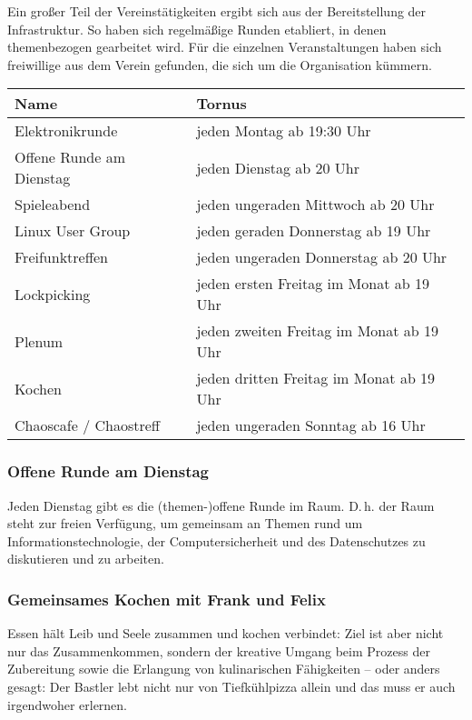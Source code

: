 \documentclass[10pt,DIV16]{scrartcl}
\begin{document}
Ein großer Teil der Vereinstätigkeiten ergibt sich aus der
Bereitstellung der Infrastruktur. So haben sich regelmäßige Runden
etabliert, in denen themenbezogen gearbeitet wird. Für die
einzelnen Veranstaltungen haben sich freiwillige aus dem Verein
gefunden, die sich um die Organisation kümmern.

\begin{table}[h]
	\begin{tabular}{l|l}
		Name   &  Tornus \\ \hline
		Elektronikrunde   &  jeden Montag ab 19:30 Uhr\\
		Offene Runde am Dienstag   &  jeden Dienstag ab 20 Uhr\\
		Spieleabend   &  jeden ungeraden Mittwoch ab 20 Uhr\\
		Linux User Group   &  jeden geraden Donnerstag ab 19 Uhr\\
		Freifunktreffen   &  jeden ungeraden Donnerstag ab 20 Uhr\\
		Lockpicking   &  jeden ersten Freitag im Monat ab 19 Uhr\\
		Plenum   &  jeden zweiten Freitag im Monat ab 19 Uhr\\
		Kochen   &  jeden dritten Freitag im Monat ab 19 Uhr\\
		Chaoscafe / Chaostreff   &  jeden ungeraden Sonntag ab 16 Uhr\\
\end{tabular}
\end{table}

\subsubsection{Offene Runde am Dienstag}

Jeden Dienstag gibt es die (themen-)offene Runde im Raum. D.\,h. der Raum
steht zur freien Verfügung, um gemeinsam an Themen rund um
Informationstechnologie, der Computersicherheit und des
Datenschutzes zu diskutieren und zu arbeiten.

\subsubsection{Gemeinsames Kochen mit Frank und Felix}

Essen hält Leib und Seele zusammen und kochen verbindet:
Ziel ist aber nicht nur das Zusammenkommen, sondern der kreative Umgang
beim Prozess der Zubereitung sowie die Erlangung von kulinarischen
Fähigkeiten -- oder anders gesagt: Der Bastler lebt nicht nur von
Tiefkühlpizza allein und das muss er auch irgendwoher erlernen.
\end{document}
